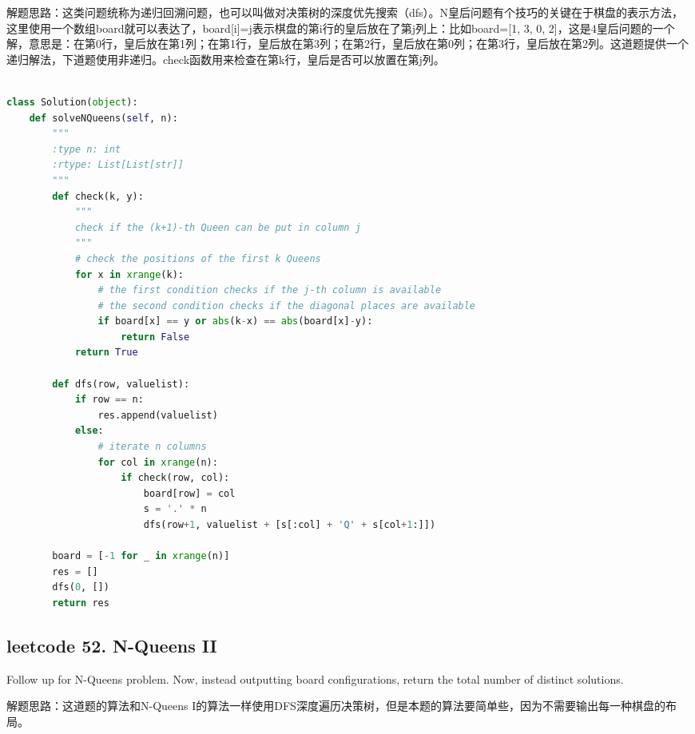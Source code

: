 \documentclass[a4paper,10pt]{article}
\begin{document}
\begin{CJK*}{UTF8}{gbsn}
\noindent 解题思路：这类问题统称为递归回溯问题，也可以叫做对决策树的深度优先搜索（dfs）。N皇后问题有个技巧的关键在于棋盘的表示方法，这里使用一个数组board就可以表达了，board[i]=j表示棋盘的第i行的皇后放在了第j列上：比如board=[1, 3, 0, 2]，这是4皇后问题的一个解，意思是：在第0行，皇后放在第1列；在第1行，皇后放在第3列；在第2行，皇后放在第0列；在第3行，皇后放在第2列。这道题提供一个递归解法，下道题使用非递归。check函数用来检查在第k行，皇后是否可以放置在第j列。 \\
\end{CJK*}

\begin{lstlisting}[language=Python, caption=Problem51. N-Queens]

class Solution(object):
    def solveNQueens(self, n):
        """
        :type n: int
        :rtype: List[List[str]]
        """
        def check(k, y):
            """
            check if the (k+1)-th Queen can be put in column j
            """
            # check the positions of the first k Queens
            for x in xrange(k):
                # the first condition checks if the j-th column is available
                # the second condition checks if the diagonal places are available
                if board[x] == y or abs(k-x) == abs(board[x]-y):
                    return False
            return True

        def dfs(row, valuelist):
            if row == n:
                res.append(valuelist)
            else:
                # iterate n columns
                for col in xrange(n):
                    if check(row, col):
                        board[row] = col
                        s = '.' * n
                        dfs(row+1, valuelist + [s[:col] + 'Q' + s[col+1:]])

        board = [-1 for _ in xrange(n)]
        res = []
        dfs(0, [])
        return res
\end{lstlisting}



\subsection{leetcode 52. N-Queens II}
Follow up for N-Queens problem. Now, instead outputting board configurations, return the total number of distinct solutions. \\

\begin{CJK*}{UTF8}{gbsn}
\noindent 解题思路：这道题的算法和N-Queens I的算法一样使用DFS深度遍历决策树，但是本题的算法要简单些，因为不需要输出每一种棋盘的布局。 \\
\end{CJK*}
\end{document}
